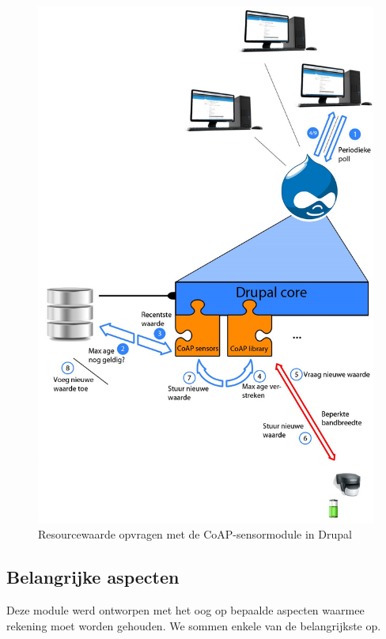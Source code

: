 \begin{figure}
\includegraphics[width=1\textwidth]{fig/architectuur}
\caption{Resourcewaarde opvragen met de CoAP-sensormodule in Drupal}
\label{fig:architectuur}
\end{figure}

\newpage
\subsection{Belangrijke aspecten}

Deze module werd ontworpen met het oog op bepaalde aspecten waarmee rekening moet worden gehouden. We sommen enkele van de belangrijkste op.

